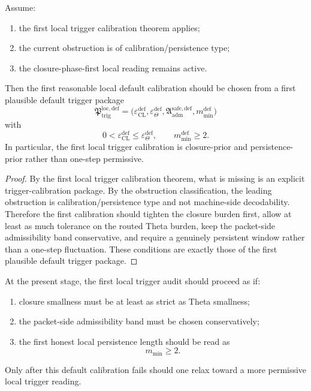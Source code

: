 \begin{theorem}
\label{thm:first-default-local-trigger-calibration-theorem}
Assume:
\begin{enumerate}
    \item the first local trigger calibration theorem applies;
    \item the current obstruction is of calibration/persistence type;
    \item the closure-phase-first local reading remains active.
\end{enumerate}
Then the first reasonable local default calibration should be chosen from a first plausible default trigger package
\[
\mathfrak{P}_{\mathrm{trig}}^{\mathrm{loc,def}}
=
\bigl(
\varepsilon_{\mathrm{CL}}^{\mathrm{def}},
\varepsilon_{\Theta}^{\mathrm{def}},
\mathfrak{A}_{\mathrm{adm}}^{\mathrm{safe,def}},
 m_{\min}^{\mathrm{def}}
\bigr)
\]
with
\[
0<\varepsilon_{\mathrm{CL}}^{\mathrm{def}} \le \varepsilon_{\Theta}^{\mathrm{def}},
\qquad
m_{\min}^{\mathrm{def}}\ge 2.
\]
In particular, the first local trigger calibration is closure-prior and persistence-prior rather than one-step permissive.
\end{theorem}

\begin{proof}
By the first local trigger calibration theorem, what is missing is an explicit trigger-calibration package.
By the obstruction classification, the leading obstruction is calibration/persistence type and not machine-side decodability.
Therefore the first calibration should tighten the closure burden first, allow at least as much tolerance on the routed Theta burden, keep the packet-side admissibility band conservative, and require a genuinely persistent window rather than a one-step fluctuation.
These conditions are exactly those of the first plausible default trigger package.
\end{proof}

\begin{corollary}
\label{cor:current-post-r15-default-working-rule}
At the present stage, the first local trigger audit should proceed as if:
\begin{enumerate}
    \item closure smallness must be at least as strict as Theta smallness;
    \item the packet-side admissibility band must be chosen conservatively;
    \item the first honest local persistence length should be read as
    \[
    m_{\min}\ge 2.
    \]
\end{enumerate}
Only after this default calibration fails should one relax toward a more permissive local trigger reading.
\end{corollary}

